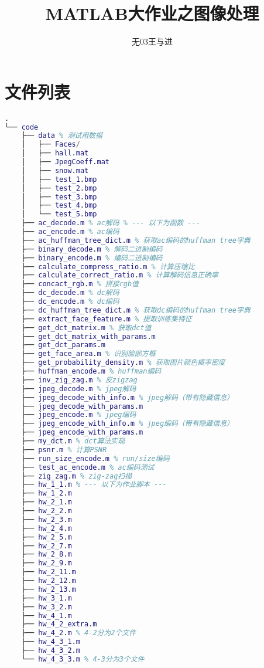 \documentclass[a4paper]{article}
\begin{document}

\title{\textbf{MATLAB大作业之图像处理}}

\author{无03\quad 王与进 }
\date{}

\maketitle

\tableofcontents

\newpage

\section{文件列表}
\begin{lstlisting}[language=matlab, caption=文件列表]
.
└── code
    ├── data % 测试用数据
    │   ├── Faces/
    │   ├── hall.mat
    │   ├── JpegCoeff.mat
    │   ├── snow.mat
    │   ├── test_1.bmp
    │   ├── test_2.bmp
    │   ├── test_3.bmp
    │   ├── test_4.bmp
    │   └── test_5.bmp
    ├── ac_decode.m % ac解码 % --- 以下为函数 ---
    ├── ac_encode.m % ac编码
    ├── ac_huffman_tree_dict.m % 获取ac编码的huffman tree字典
    ├── binary_decode.m % 解码二进制编码
    ├── binary_encode.m % 编码二进制编码
    ├── calculate_compress_ratio.m % 计算压缩比
    ├── calculate_correct_ratio.m % 计算解码信息正确率
    ├── concact_rgb.m % 拼接rgb值
    ├── dc_decode.m % dc解码
    ├── dc_encode.m % dc编码
    ├── dc_huffman_tree_dict.m % 获取dc编码的huffman tree字典
    ├── extract_face_feature.m % 提取训练集特征
    ├── get_dct_matrix.m % 获取dct值
    ├── get_dct_matrix_with_params.m
    ├── get_dct_params.m
    ├── get_face_area.m % 识别脸部方框
    ├── get_probability_density.m % 获取图片颜色概率密度
    ├── huffman_encode.m % huffman编码
    ├── inv_zig_zag.m % 反zigzag
    ├── jpeg_decode.m % jpeg解码
    ├── jpeg_decode_with_info.m % jpeg解码（带有隐藏信息）
    ├── jpeg_decode_with_params.m
    ├── jpeg_encode.m % jpeg编码
    ├── jpeg_encode_with_info.m % jpeg编码（带有隐藏信息）
    ├── jpeg_encode_with_params.m
    ├── my_dct.m % dct算法实现
    ├── psnr.m % 计算PSNR
    ├── run_size_encode.m % run/size编码
    ├── test_ac_encode.m % ac编码测试
    ├── zig_zag.m % zig-zag扫描
    ├── hw_1_1.m % --- 以下为作业脚本 ---
    ├── hw_1_2.m
    ├── hw_2_1.m
    ├── hw_2_2.m
    ├── hw_2_3.m
    ├── hw_2_4.m
    ├── hw_2_5.m
    ├── hw_2_7.m
    ├── hw_2_8.m
    ├── hw_2_9.m
    ├── hw_2_11.m
    ├── hw_2_12.m
    ├── hw_2_13.m
    ├── hw_3_1.m
    ├── hw_3_2.m
    ├── hw_4_1.m
    ├── hw_4_2_extra.m
    ├── hw_4_2.m % 4-2分为2个文件
    ├── hw_4_3_1.m
    ├── hw_4_3_2.m
    └── hw_4_3_3.m % 4-3分为3个文件
    
\end{lstlisting}
\end{document}
